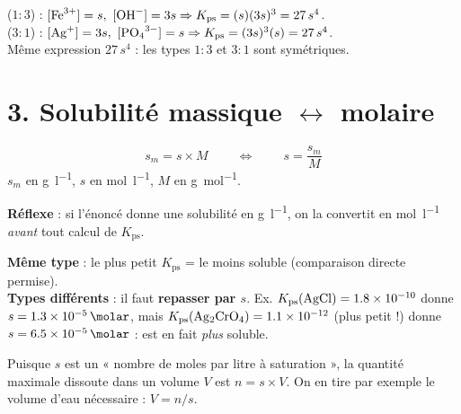 \documentclass[11pt,a4paper]{article}
\newcommand{\Kps}{K_{\mathrm{ps}}}
\begin{document}
\begin{exemple}
 ($1{:}3$) : $[\ce{Fe^3+}]=s,\ [\ce{OH-}]=3s \Rightarrow \Kps=(s)(3s)^{3}=27\,s^{4}$.\\
 ($3{:}1$) : $[\ce{Ag+}]=3s,\ [\ce{PO4^3-}]=s \Rightarrow \Kps=(3s)^{3}(s)=27\,s^{4}$.\\
Même expression $27\,s^{4}$ : les types $1{:}3$ et $3{:}1$ sont symétriques.
\end{exemple}

\section*{3. Solubilité massique $\leftrightarrow$ molaire}
\begin{formule}
\[ \boxed{\ s_m = s\times M\ }\qquad\Longleftrightarrow\qquad \boxed{\ s = \dfrac{s_m}{M}\ } \]
$s_m$ en \si{\gram\per\litre}, $s$ en \si{\mole\per\litre}, $M$ en \si{\gram\per\mole}.
\end{formule}
\noindent\textbf{Réflexe} : si l'énoncé donne une solubilité en \si{\gram\per\litre}, on la convertit en
\si{\mole\per\litre} \emph{avant} tout calcul de $\Kps$.

\begin{astuce}
\textbf{Même type} : le plus petit $\Kps$ = le moins soluble (comparaison directe permise).\\
\textbf{Types différents} : il faut \textbf{repasser par $s$}. Ex. $\Kps(\ce{AgCl})=\num{1{,}8e-10}$
donne $s=\qty{1{,}3e-5}{\molar}$, mais $\Kps(\ce{Ag2CrO4})=\num{1{,}1e-12}$ (plus petit !) donne
$s=\qty{6{,}5e-5}{\molar}$ :  est en fait \emph{plus} soluble.
\end{astuce}

\begin{astuce}
Puisque $s$ est un « nombre de moles par litre à saturation », la quantité maximale dissoute dans un
volume $V$ est $n=s\times V$. On en tire par exemple le volume d'eau nécessaire : $V=n/s$.
\end{astuce}
\end{document}
